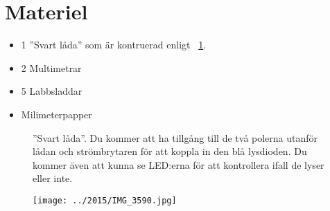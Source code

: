 \documentclass[12pt,a4paper]{article}
\newcommand{\figref}{\MakeLowercase{\figurename}~\ref}
\begin{document}
\section*{Materiel}

\begin{itemize}
\item 1 ''Svart låda'' som är kontruerad enligt \figref{svart_låda}.
\item 2 Multimetrar
\item 5 Labbsladdar
\item Milimeterpapper
\end{itemize}


\begin{figure}\centering

\caption{\label{svart_låda} ''Svart låda''. Du kommer att ha tillgång
  till de två polerna utanför lådan och strömbrytaren för att koppla in den
  blå lysdioden. Du kommer även att kunna se LED:erna för att
  kontrollera ifall de lyser eller inte. }
\end{figure}

\begin{figure}\centering
\centerline{ %
\texttt{[image: ../2015/IMG\_3590.jpg]}
}
\end{figure}
\end{document}
